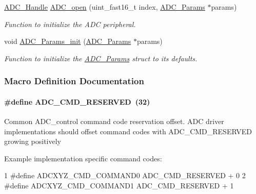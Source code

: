 \begin{DoxyCompactItemize}
\hyperlink{_a_d_c_8h_ac98b1222559c172df43505d672e1376c}{A\+D\+C\+\_\+\+Handle} \hyperlink{_a_d_c_8h_a9f3e5f311cda4df63e70660651b9314e}{A\+D\+C\+\_\+open} (uint\+\_\+fast16\+\_\+t index, \hyperlink{struct_a_d_c___params}{A\+D\+C\+\_\+\+Params} $\ast$params)
\begin{DoxyCompactList}\small\item\em Function to initialize the A\+D\+C peripheral. \end{DoxyCompactList}\item 
void \hyperlink{_a_d_c_8h_a21df1c0987f5cecb660581ae081c4dc7}{A\+D\+C\+\_\+\+Params\+\_\+init} (\hyperlink{struct_a_d_c___params}{A\+D\+C\+\_\+\+Params} $\ast$params)
\begin{DoxyCompactList}\small\item\em Function to initialize the \hyperlink{struct_a_d_c___params}{A\+D\+C\+\_\+\+Params} struct to its defaults. \end{DoxyCompactList}\end{DoxyCompactItemize}


\subsubsection{Macro Definition Documentation}
\paragraph[{A\+D\+C\+\_\+\+C\+M\+D\+\_\+\+R\+E\+S\+E\+R\+V\+E\+D}]{\setlength{\rightskip}{0pt plus 5cm}\#define A\+D\+C\+\_\+\+C\+M\+D\+\_\+\+R\+E\+S\+E\+R\+V\+E\+D~(32)}\label{_a_d_c_8h_a1850e2c1e2791103d1102917d1e5b01b}
Common A\+D\+C\+\_\+control command code reservation offset. A\+D\+C driver implementations should offset command codes with A\+D\+C\+\_\+\+C\+M\+D\+\_\+\+R\+E\+S\+E\+R\+V\+E\+D growing positively

Example implementation specific command codes\+: 
\begin{DoxyCode}
1 #define ADCXYZ\_CMD\_COMMAND0      ADC\_CMD\_RESERVED + 0
2 #define ADCXYZ\_CMD\_COMMAND1      ADC\_CMD\_RESERVED + 1
\end{DoxyCode}
